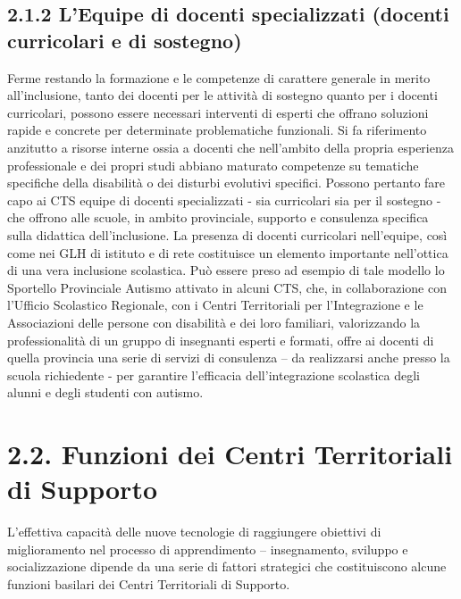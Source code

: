 \subsection*{2.1.2 L'Equipe di docenti specializzati (docenti curricolari e di sostegno)}
Ferme restando la formazione e le competenze di carattere generale in merito all'inclusione, tanto dei docenti
per le attività di sostegno quanto per i docenti curricolari, possono essere necessari interventi di esperti che
offrano soluzioni rapide e concrete per determinate problematiche funzionali. Si fa riferimento anzitutto a
risorse interne ossia a docenti che nell'ambito della propria esperienza professionale e dei propri studi
abbiano maturato competenze su tematiche specifiche della disabilità o dei disturbi evolutivi specifici.
Possono pertanto fare capo ai CTS equipe di docenti specializzati - sia curricolari sia per il sostegno - che
offrono alle scuole, in ambito provinciale, supporto e consulenza specifica sulla didattica dell'inclusione. La
presenza di docenti curricolari nell'equipe, così come nei GLH di istituto e di rete costituisce un elemento
importante nell'ottica di una vera inclusione scolastica.
Può essere preso ad esempio di tale modello lo Sportello Provinciale Autismo attivato in alcuni CTS, che, in
collaborazione con l'Ufficio Scolastico Regionale, con i Centri Territoriali per l'Integrazione e le
Associazioni delle persone con disabilità e dei loro familiari, valorizzando la professionalità di un gruppo di
insegnanti esperti e formati, offre ai docenti di quella provincia una serie di servizi di consulenza – da
realizzarsi anche presso la scuola richiedente - per garantire l'efficacia dell'integrazione scolastica degli
alunni e degli studenti con autismo.
\section*{2.2. Funzioni dei Centri Territoriali di Supporto}
L'effettiva capacità delle nuove tecnologie di raggiungere obiettivi di miglioramento nel processo di
apprendimento – insegnamento, sviluppo e socializzazione dipende da una serie di fattori strategici che
costituiscono alcune funzioni basilari dei Centri Territoriali di Supporto.
